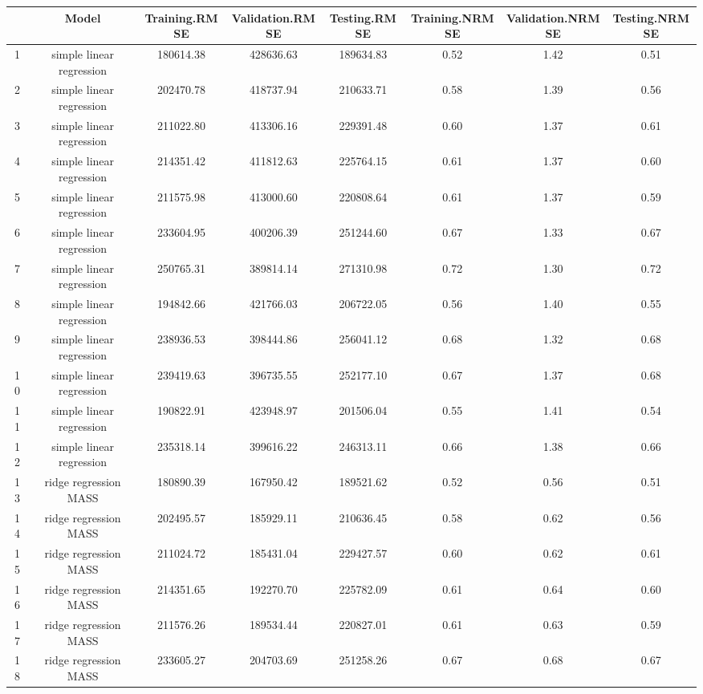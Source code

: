 % 
\begin{tabular}{cccccccc}
  \hline
 & Model & Training.RMSE & Validation.RMSE & Testing.RMSE & Training.NRMSE & Validation.NRMSE & Testing.NRMSE \\ 
  \hline
1 & simple linear regression & 180614.38 & 428636.63 & 189634.83 & 0.52 & 1.42 & 0.51 \\ 
  2 & simple linear regression & 202470.78 & 418737.94 & 210633.71 & 0.58 & 1.39 & 0.56 \\ 
  3 & simple linear regression & 211022.80 & 413306.16 & 229391.48 & 0.60 & 1.37 & 0.61 \\ 
  4 & simple linear regression & 214351.42 & 411812.63 & 225764.15 & 0.61 & 1.37 & 0.60 \\ 
  5 & simple linear regression & 211575.98 & 413000.60 & 220808.64 & 0.61 & 1.37 & 0.59 \\ 
  6 & simple linear regression & 233604.95 & 400206.39 & 251244.60 & 0.67 & 1.33 & 0.67 \\ 
  7 & simple linear regression & 250765.31 & 389814.14 & 271310.98 & 0.72 & 1.30 & 0.72 \\ 
  8 & simple linear regression & 194842.66 & 421766.03 & 206722.05 & 0.56 & 1.40 & 0.55 \\ 
  9 & simple linear regression & 238936.53 & 398444.86 & 256041.12 & 0.68 & 1.32 & 0.68 \\ 
  10 & simple linear regression & 239419.63 & 396735.55 & 252177.10 & 0.67 & 1.37 & 0.68 \\ 
  11 & simple linear regression & 190822.91 & 423948.97 & 201506.04 & 0.55 & 1.41 & 0.54 \\ 
  12 & simple linear regression & 235318.14 & 399616.22 & 246313.11 & 0.66 & 1.38 & 0.66 \\ 
  13 & ridge regression MASS & 180890.39 & 167950.42 & 189521.62 & 0.52 & 0.56 & 0.51 \\ 
  14 & ridge regression MASS & 202495.57 & 185929.11 & 210636.45 & 0.58 & 0.62 & 0.56 \\ 
  15 & ridge regression MASS & 211024.72 & 185431.04 & 229427.57 & 0.60 & 0.62 & 0.61 \\ 
  16 & ridge regression MASS & 214351.65 & 192270.70 & 225782.09 & 0.61 & 0.64 & 0.60 \\ 
  17 & ridge regression MASS & 211576.26 & 189534.44 & 220827.01 & 0.61 & 0.63 & 0.59 \\ 
  18 & ridge regression MASS & 233605.27 & 204703.69 & 251258.26 & 0.67 & 0.68 & 0.67 \\ 

\end{tabular}
